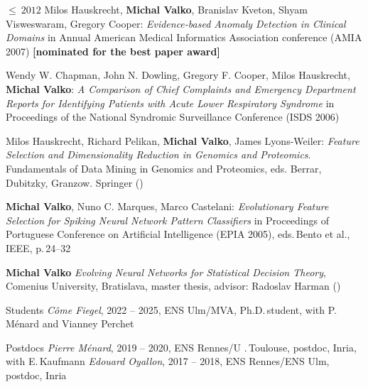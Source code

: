 \documentclass{resume}
\begin{document}
\begin{category}{$\leq\ 2012$}
\citembullet   
Milos Hauskrecht, {\bf Michal Valko}, Branislav Kveton, Shyam Visweswaram, Gregory Cooper:
\emph{Evidence-based Anomaly Detection in Clinical Domains} in Annual American Medical Informatics
Association conference ({\sf AMIA 2007}) {\bf [nominated for the best paper award]}


\citembullet  
Wendy W. Chapman, John N. Dowling, Gregory F. Cooper, Milos Hauskrecht, {\bf Michal Valko}: \emph{A Comparison of Chief Complaints and Emergency Department Reports for Identifying Patients with Acute Lower Respiratory Syndrome} in Proceedings of the National Syndromic Surveillance Conference ({\sf ISDS 2006})

\citembullet  
Milos Hauskrecht, Richard Pelikan, {\bf Michal Valko}, James Lyons-Weiler:
\emph{Feature Selection and Dimensionality Reduction in Genomics and
Proteomics}. Fundamentals of Data Mining in Genomics and Proteomics,
eds. Berrar, Dubitzky, Granzow. Springer ({})

\citembullet 
{\bf Michal Valko}, Nuno C. Marques, Marco Castelani: \emph{Evolutionary Feature
Selection for Spiking Neural Network Pattern Classifiers} in
Proceedings of Portuguese Conference on Artificial Intelligence
({\sf EPIA 2005}), eds.\,Bento et al., IEEE, p.\,24--32

\citembullet 
{\bf Michal Valko} \emph{Evolving Neural Networks for Statistical Decision
Theory}, Comenius University, Bratislava, master thesis, advisor: Radoslav Harman ({})

\end{category}
\begin{category}{Students}
\citembullet  \emph{C\^{o}me Fiegel}, 2022 -- 2025, ENS Ulm/MVA,  Ph.D.\,student, with P.\,M\'enard and Vianney Perchet
\end{category}

\begin{category}{Postdocs}
\citembullet \textit{Pierre M\'enard}, 2019 -- 2020,  ENS Rennes/U .\,Toulouse, postdoc, Inria, with E.\,Kaufmann 
\citembullet \textit{Edouard Oyallon}, 2017 -- 2018,  ENS Rennes/ENS Ulm, postdoc, Inria 
\end{category}
\end{document}
